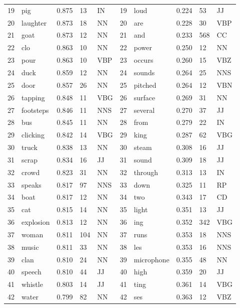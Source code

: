 \begin{table*}[!ht]
\begin{tabular}{lllll|lllll}
        19 & pig & 0.875 & 13 & IN & 19 & loud & 0.224 & 53 & JJ \\ 
        20 & laughter & 0.873 & 18 & NN & 20 & are & 0.228 & 30 & VBP \\ 
        21 & goat & 0.873 & 12 & NN & 21 & and & 0.233 & 568 & CC \\ 
        22 & clo & 0.863 & 10 & NN & 22 & power & 0.250 & 12 & NN \\ 
        23 & pour & 0.863 & 10 & VBP & 23 & occurs & 0.260 & 15 & VBZ \\ 
        24 & duck & 0.859 & 12 & NN & 24 & sounds & 0.264 & 25 & NNS \\ 
        25 & door & 0.857 & 26 & NN & 25 & pitched & 0.264 & 12 & VBN \\ 
        26 & tapping & 0.848 & 11 & VBG & 26 & surface & 0.269 & 31 & NN \\ 
        27 & footsteps & 0.846 & 11 & NNS & 27 & several & 0.270 & 37 & JJ \\ 
        28 & bus & 0.845 & 11 & NN & 28 & from & 0.279 & 22 & IN \\ 
        29 & clicking & 0.842 & 14 & VBG & 29 & king & 0.287 & 62 & VBG \\ 
        30 & truck & 0.838 & 13 & NN & 30 & steam & 0.308 & 16 & JJ \\ 
        31 & scrap & 0.834 & 16 & JJ & 31 & sound & 0.309 & 18 & JJ \\ 
        32 & crowd & 0.823 & 31 & NN & 32 & through & 0.313 & 13 & IN \\ 
        33 & speaks & 0.817 & 97 & NNS & 33 & down & 0.325 & 11 & RP \\ 
        34 & boat & 0.817 & 12 & NN & 34 & two & 0.343 & 17 & CD \\ 
        35 & cat & 0.815 & 14 & NN & 35 & light & 0.351 & 13 & JJ \\ 
        36 & explosion & 0.813 & 12 & NN & 36 & ing & 0.352 & 342 & VBG \\ 
        37 & woman & 0.811 & 104 & NN & 37 & runs & 0.353 & 18 & NNS \\ 
        38 & music & 0.811 & 33 & NN & 38 & les & 0.353 & 16 & NNS \\ 
        39 & clan & 0.810 & 24 & NN & 39 & microphone & 0.355 & 48 & NN \\ 
        40 & speech & 0.810 & 44 & JJ & 40 & high & 0.359 & 20 & JJ \\ 
        41 & whistle & 0.803 & 14 & JJ & 41 & ting & 0.361 & 14 & VBG \\ 
        42 & water & 0.799 & 82 & NN & 42 & ses & 0.363 & 12 & VBZ \\ 

\end{tabular}
\end{table*}
